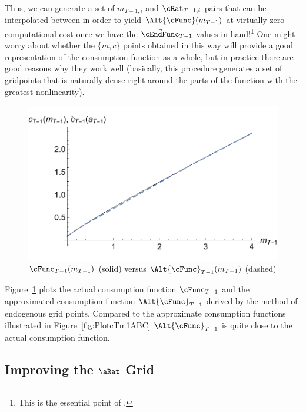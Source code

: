 \documentclass[titlepage]{\econtex}
\begin{document}
Thus, we can generate a set of ${m}_{T-1,i}$ and ${\cRat}_{T-1,i}$
pairs that can be interpolated between in order to yield
$\Alt{\cFunc}({m}_{T-1})$ at virtually zero computational cost once we
have the $\vec{\cEndFunc}_{T-1}$ values in hand!\footnote{This is
  the essential point of \cite{carrollEGM}.} One might worry
about whether the $\{{m},{c}\}$ points obtained in this way will provide a
good representation of the consumption function as a whole, but in
practice there are good reasons why they work well (basically, this
procedure generates a set of gridpoints that is naturally dense right
around the parts of the function with the greatest nonlinearity).
\hypertarget{PlotComparecTm1AD}{}
\begin{figure}
  \includegraphics{./Figures/PlotComparecTm1AD}
  \caption{$\cFunc_{T-1}({m}_{T-1})$ (solid) versus $\Alt{\cFunc}_{T-1}({m}_{T-1})$ (dashed)}
  \label{fig:ComparecTm1AD}
\end{figure}
Figure~\ref{fig:ComparecTm1AD} plots the actual consumption function
${\cFunc}_{T-1}$ and the approximated consumption function $\Alt{\cFunc}_{T-1}$
derived by the method of endogenous grid points. Compared to the approximate consumption
functions illustrated in Figure~\ref{fig:PlotcTm1ABC} $\Alt{\cFunc}_{T-1}$ is quite close
to the actual consumption function.



\hypertarget{Improving-the-a-Grid}{}
\subsection{Improving the $\aRat$ Grid}
\end{document}
